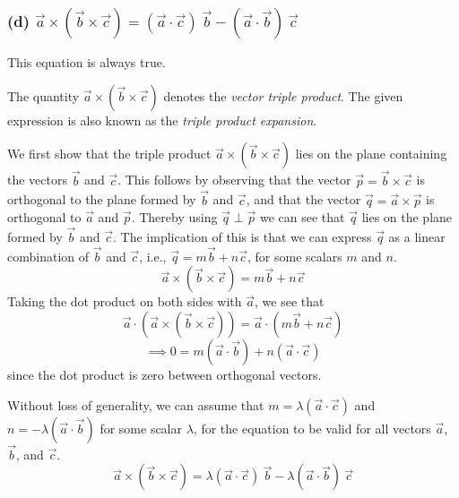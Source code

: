 \newpage
\subsubsection*{(d) \( \vec{a} \times (\vec{b} \times \vec{c}) = (\vec{a} \cdot \vec{c})\ \vec{b} - (\vec{a} \cdot \vec{b})\ \vec{c} \)}

This equation is always true.

The quantity \( \vec{a} \times (\vec{b} \times \vec{c}) \) denotes the \textit{vector triple product}.
The given expression is also known as the \textit{triple product expansion}.

We first show that the triple product \( \vec{a} \times (\vec{b} \times \vec{c}) \) lies on the plane containing the vectors \( \vec{b} \) and  \( \vec{c} \).
This follows by observing that the vector \( \vec{p} = \vec{b} \times \vec{c}\) is orthogonal to the plane formed by \( \vec{b} \) and  \( \vec{c} \), and that the vector \( \vec{q} = \vec{a} \times \vec{p} \) is orthogonal to \( \vec{a} \) and \( \vec{p} \).
Thereby using \( \vec{q} \perp \vec{p} \) we can see that \( \vec{q} \) lies on the plane formed by \( \vec{b} \) and  \( \vec{c} \).
The implication of this is that we can express \( \vec{q} \) as a linear combination of \( \vec{b} \) and  \( \vec{c} \), i.e., \( \vec{q} = m\vec{b} + n\vec{c} \), for some scalars \( m \) and \( n \).
\begin{equation*}
    \vec{a} \times (\vec{b} \times \vec{c}) = m\vec{b} + n\vec{c}
\end{equation*}
Taking the dot product on both sides with \( \vec{a} \), we see that
\[
    \vec{a} \cdot (\vec{a} \times (\vec{b} \times \vec{c})) = \vec{a} \cdot (m\vec{b} + n\vec{c})
\]
\[
    \implies 0 = m(\vec{a} \cdot \vec{b}) + n(\vec{a} \cdot \vec{c})
\]
since the dot product is zero between orthogonal vectors.

Without loss of generality, we can assume that \( m = \lambda(\vec{a} \cdot \vec{c}) \) and \( n = -\lambda(\vec{a} \cdot \vec{b}) \) for some scalar \( \lambda \), for the equation to be valid for all vectors \( \vec{a} \), \( \vec{b} \), and \( \vec{c} \).
\begin{equation}
    \vec{a} \times (\vec{b} \times \vec{c}) = \lambda (\vec{a} \cdot \vec{c})\ \vec{b} - \lambda (\vec{a} \cdot \vec{b})\ \vec{c}
    \tag{6.d.1}
    \label{eq:6.d.1}
\end{equation}

